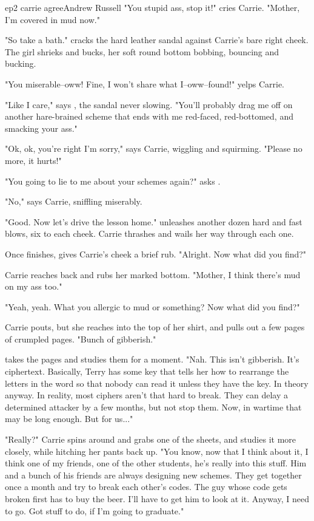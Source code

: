 \documentclass{book}
\begin{document}
\begin{childnode}{ep2 carrie agree}{Andrew Russell}
     "You stupid ass, stop it!" cries Carrie. "Mother, I'm covered in mud now."

     "So take a bath." \name{} cracks the hard leather sandal against Carrie's bare right cheek. The girl shrieks and bucks, her soft round bottom bobbing, bouncing and bucking.

     "You miserable--oww! Fine, I won't share what I--oww--found!" yelps Carrie.

     "Like I care," says \name{}, the sandal never slowing. "You'll probably drag me off on another hare-brained scheme that ends with me red-faced, red-bottomed, and smacking your ass."

     "Ok, ok, you're right I'm sorry," says Carrie, wiggling and squirming. "Please no more, it hurts!"

     "You going to lie to me about your schemes again?" asks \name{}.

     "No," says Carrie, sniffling miserably.

     "Good. Now let's drive the lesson home." \name{} unleashes another dozen hard and fast blows, six to each cheek. Carrie thrashes and wails her way through each one.

     Once \name{} finishes, \heshe{} gives Carrie's cheek a brief rub. "Alright. Now what did you find?"

     Carrie reaches back and rubs her marked bottom. "Mother, I think there's mud on my ass too."

     "Yeah, yeah. What you allergic to mud or something? Now what did you find?"

     Carrie pouts, but she reaches into the top of her shirt, and pulls out a few pages of crumpled pages. "Bunch of gibberish."

     \name{} takes the pages and studies them for a moment. "Nah. This isn't gibberish. It's ciphertext. Basically, Terry has some key that tells her how to rearrange the letters in the word so that
     nobody can read it unless they have the key. In theory anyway. In reality, most ciphers aren't that hard to break. They can delay a determined attacker by a few months, but not stop them. Now,
     in wartime that may be long enough. But for us..."

     "Really?" Carrie spins around and grabs one of the sheets, and studies it more closely, while hitching her pants back up. "You know, now that I think about it, I think one of my friends, one of 
     the other students, he's really
     into this stuff. Him and a bunch of his friends are always designing new schemes. They get together once a month and try to break each other's codes. The guy whose code gets broken first has
     to buy the beer. I'll have to get him to look at it. Anyway, I need to go. Got stuff to do, if I'm going to graduate."


\end{childnode}
\end{document}
